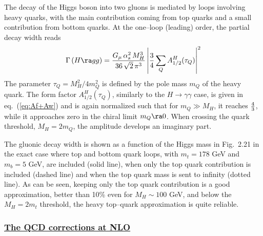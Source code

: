 The decay of the Higgs boson into two gluons is mediated by loops involving
heavy quarks, with the main contribution coming from top quarks and a small 
contribution from bottom quarks. At the one--loop (leading) order, the partial
decay width reads \cite{HggBorn,pp-ggH-LO}
\begin{eqnarray}
\Gamma\, (H\ra gg) = \frac{G_{\mu}\, \alpha_{s}^{2}\,M_{H}^{3}}
{36\,\sqrt{2}\,\pi^{3}}\left| \frac{3}{4} \sum_{Q} A_{1/2}^H(\tau_Q) \right|^2
\label{eq:hgglo}
\end{eqnarray}
The parameter $\tau_Q=M_H^2/4m_Q^2$ is defined by the pole mass $m_Q$ of the
heavy quark. The form factor $A_{1/2}^H(\tau_Q)$, similarly to the $H \to
\gamma \gamma$ case, is given in eq.~(\ref{eq:Af+Aw}) and is again normalized
such that for $m_Q \gg M_H$, it  reaches ${4\over 3}$,  while it approaches
zero in the chiral limit $m_Q \ra 0$. When crossing the quark threshold,
$M_H=2m_Q$, the amplitude develops an imaginary part.\s

The gluonic decay  width is shown as a function of the Higgs mass in Fig.~2.21
in the exact  case where top and bottom quark loops, with $m_t=178$ GeV and
$m_b=5$ GeV, are  included (solid line), when only the top quark contribution 
is included (dashed line) and when the top quark mass is sent to infinity 
(dotted line). As can be seen, keeping only the top quark contribution is a 
good approximation, better than 10\% even for $M_H \sim 100$ GeV, and below the 
$M_H=2m_t$ threshold, the heavy top--quark approximation is quite reliable.\s

\begin{figure}[!h]
\begin{center}
\vspace*{-2.7cm}
\hspace*{-3cm}
\end{center}
\vspace*{-13.8cm}
\vspace*{-.5cm}
\end{figure}

\subsubsection*{\underline{The QCD corrections at NLO}}

